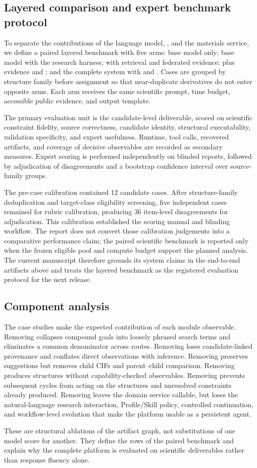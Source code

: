 \subsection{Layered comparison and expert benchmark protocol}
\label{sec:benchmark}

To separate the contributions of the language model, \hermes, and the materials service, we define a paired layered benchmark with five arms: base model only; base model with the \hermes research harness; \hermes with retrieval and federated evidence; \hermes plus evidence and \mattransform; and the complete system with \matdag and \matevolve.  Cases are grouped by structure family before assignment so that near-duplicate derivatives do not enter opposite arms.  Each arm receives the same scientific prompt, time budget, accessible public evidence, and output template.

The primary evaluation unit is the candidate-level deliverable, scored on scientific constraint fidelity, source correctness, candidate identity, structural executability, validation specificity, and expert usefulness.  Runtime, tool calls, recovered artifacts, and coverage of decisive observables are recorded as secondary measures.  Expert scoring is performed independently on blinded reports, followed by adjudication of disagreements and a bootstrap confidence interval over source-family groups.

The pre-case calibration contained 12 candidate cases.  After structure-family deduplication and target-class eligibility screening, five independent cases remained for rubric calibration, producing 36 item-level disagreements for adjudication.  This calibration established the scoring manual and blinding workflow.  The report does not convert those calibration judgements into a comparative performance claim; the paired scientific benchmark is reported only when the frozen eligible pool and compute budget support the planned analysis.  The current manuscript therefore grounds its system claims in the end-to-end artifacts above and treats the layered benchmark as the registered evaluation protocol for the next release.

\subsection{Component analysis}

The case studies make the expected contribution of each module observable.  Removing \matspec collapses compound goals into loosely phrased search terms and eliminates a common denominator across routes.  Removing \matevidence loses candidate-linked provenance and conflates direct observations with inference.  Removing \mattransform preserves suggestions but removes child CIFs and parent--child comparison.  Removing \matdag produces structures without capability-checked observables.  Removing \matevolve prevents subsequent cycles from acting on the structures and unresolved constraints already produced.  Removing \hermes leaves the domain service callable, but loses the natural-language research interaction, Profile/Skill policy, controlled continuation, and workflow-level evolution that make the platform usable as a persistent agent.

These are structural ablations of the artifact graph, not substitutions of one model score for another.  They define the rows of the paired benchmark and explain why the complete platform is evaluated on scientific deliverables rather than response fluency alone.
